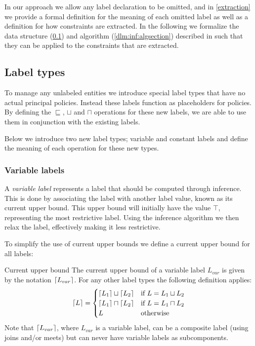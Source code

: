 In our approach we allow any label declaration to be omitted, and in \cref{extraction} we provide a formal definition for the meaning of each omitted label as well as a definition for how constraints are extracted.
In the following we formalize the data structure (\cref{dlm:inf:types}) and algorithm (\cref{dlm:inf:algsection}) described in \cite{myers1997} such that they can be applied to the constraints that are extracted.

\subsection{Label types}\label{dlm:inf:types}
To manage any unlabeled entities we introduce special label types that have no actual principal policies.
Instead these labels function as placeholders for policies.
By defining the $\sqsubseteq$, $\sqcup$ and $\sqcap$ operations for these new labels, we are able to use them in conjunction with the existing labels.

Below we introduce two new label types; variable and constant labels and define the meaning of each operation for these new types.

\subsubsection{Variable labels}
A \textit{variable label} represents a label that should be computed through inference.
This is done by associating the label with another label value, known as its current upper bound.
This upper bound will initially have the value $\top$, representing the most restrictive label.
Using the inference algorithm we then relax the label, effectively making it less restrictive.

To simplify the use of current upper bounds we define a current upper bound for all labels:

\begin{definition}{Current upper bound}\label{dlm:def:upperbound}
  The current upper bound of a variable label $L_{var}$ is given by the notation $\lceil L_{var}\rceil$.
  For any other label types the following definition applies:
  \[
  \lceil L\rceil =
  \begin{cases}
    \lceil L_1\rceil \sqcup \lceil L_2\rceil & \text{if } L = L_1 \sqcup L_2 \\
    \lceil L_1\rceil \sqcap \lceil L_2\rceil & \text{if } L = L_1 \sqcap L_2 \\
    L & \text{otherwise}
  \end{cases}
  \]
  Note that $\lceil L_{var}\rceil$, where $L_{var}$ is a variable label, can be a composite label (using joins and/or meets) but can never have variable labels as subcomponents.
\end{definition}

